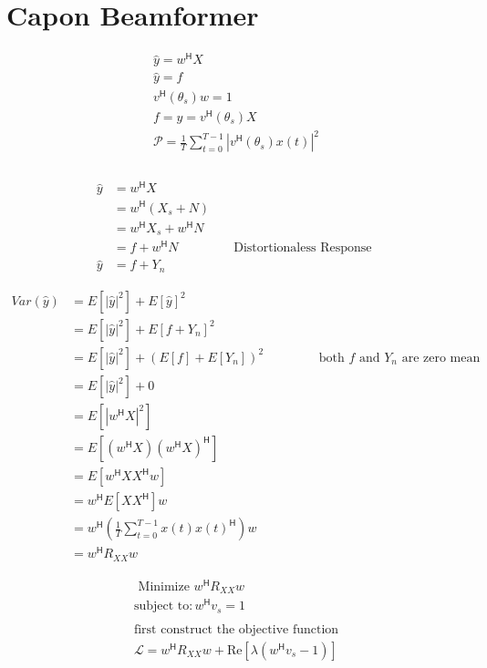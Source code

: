 \documentclass{article}
\begin{document}
\newpage


\section{Capon Beamformer}

\begin{align*}
	\hat{y} = w^\mathsf{H} X
	\\
	\hat{y} = f
	\\
	v^\mathsf{H}(\theta_s) w = 1
	\\
	f = y = v^\mathsf{H}(\theta_s) X
	\\
	\mathcal{P} = \frac{1}{T} \sum_{t=0}^{T-1} | v^\mathsf{H}(\theta_s) x(t) | ^2
	\\
	\\
\end{align*}

\begin{align*}
	\hat{y} &= w^\mathsf{H} X
	\\
	&= w^\mathsf{H} (X_s + N)
	\\
	&= w^\mathsf{H} X_s + w^\mathsf{H} N
	\\
	&= f + w^\mathsf{H} N \qquad\qquad \text{ Distortionaless Response }
	\\
	\hat{y} &= f + Y_n
\end{align*}


\begin{align*}
	Var(\hat{y}) &= E[|\hat{y}|^2] + E[\hat{y}]^2
	\\
	&= E[|\hat{y}|^2] + E[f + Y_n]^2
	\\
	&= E[|\hat{y}|^2] + (E[f] + E[Y_n])^2 \qquad\qquad \text{ both $f$ and $Y_n$ are zero mean }
	\\
	&= E[|\hat{y}|^2] + 0
	\\
	&= E[|w^\mathsf{H} X|^2]
	\\
	&= E[(w^\mathsf{H} X)(w^\mathsf{H} X)^\mathsf{H}]
	\\
	&= E[w^\mathsf{H} X X^\mathsf{H} w]
	\\
	&= w^\mathsf{H} E[X X^\mathsf{H}] w
	\\
	&= w^\mathsf{H} \left( \frac{1}{T} \sum_{t=0}^{T-1} x(t) x(t)^\mathsf{H} \right) w
	\\
	&= w^\mathsf{H} R_{XX} w
\end{align*}


\begin{align*}
	\text{ Minimize } w^\mathsf{H} R_{XX} w \\
	\text{subject to} : w^\mathsf{H}v_s  = 1
	\\
	\\
	\text{first construct the objective function}
	\\
	\mathcal{L} = w^\mathsf{H} R_{XX} w + \text{Re} [\lambda (w^\mathsf{H}v_s - 1)]
\end{align*}
\end{document}
